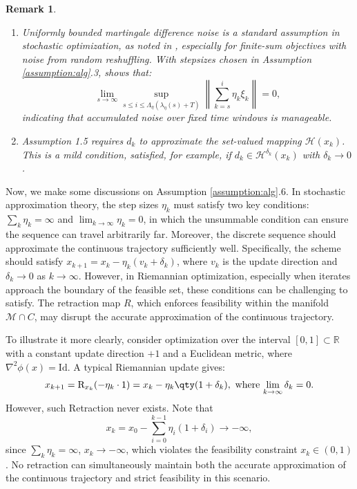 \documentclass[11pt]{article}
\def\norm#1{\left\|#1\right\|}
\newtheorem{remark}{Remark}[section]
\begin{document}
\begin{remark}
\begin{enumerate}
        
        \item 
        Uniformly bounded martingale difference noise is a standard assumption in stochastic optimization, as noted in \cite{castera2021inertial,xiao2023adam}, especially for finite-sum objectives with noise from random reshuffling. With stepsizes chosen in Assumption \ref{assumption:alg}.3, \cite{benaim2005stochastic} shows that:
        \begin{equation}
            \lim_{s\rightarrow\infty}\sup_{s\leq i\leq\Lambda_\eta(\lambda_\eta(s)+T)}\norm{\sum_{k=s}^i\eta_k\xi_k}=0,
            \label{Eq:noise_cond}
        \end{equation}   
        indicating that accumulated noise over fixed time windows is manageable.
        \item Assumption 1.5 requires $d_k$ to approximate the set-valued mapping $\mathcal{H}(x_k)$. This is a mild condition, satisfied, for example, if $d_k \in \mathcal{H}^{\delta_k}(x_k)$ with $\delta_k \to 0$.
    \end{enumerate}
\end{remark}


Now, we make some discussions on Assumption \ref{assumption:alg}.6. In stochastic approximation theory, the step sizes $\eta_k$ must satisfy two key conditions: $\sum_{k}\eta_k=\infty$ and $\lim_{k\to\infty}\eta_k=0$, in which the unsummable condition can ensure the sequence can travel arbitrarily far. Moreover, the discrete sequence should approximate the continuous trajectory sufficiently well. Specifically, the scheme should satisfy $x_{k+1}=x_k-\eta_k(v_k+\delta_k)$, where $v_k$ is the update direction and $\delta_k \to 0$ as $k \to \infty$. However, in Riemannian optimization, especially when iterates approach the boundary of the feasible set, these conditions can be challenging to satisfy. The retraction map $R$, which enforces feasibility within the manifold $\mathcal{M} \cap C$, may disrupt the accurate approximation of the continuous trajectory.

To illustrate it more clearly, consider optimization over the interval $[0,1] \subset \mathbb{R}$ with a constant update direction $+1$ and a Euclidean metric, where $\nabla^2 \phi(x) = \text{Id}$. A typical Riemannian update gives:
\[
x_{k+1}={\rm R}_{x_k}(-\eta_k\cdot1)=x_k-\eta_k\qty(1+\delta_k),\text{ where $\lim_{k\to\infty}\delta_k=0$.}
\]
However, such Retraction never exists. Note that 
\[
x_{k}=x_0-\sum_{i=0}^{k-1}\eta_i(1+\delta_i)\to-\infty,
\]
since $\sum_{k} \eta_k = \infty$, $x_k \to -\infty$, which violates the feasibility constraint $x_k \in (0,1)$. No retraction can simultaneously maintain both the accurate approximation of the continuous trajectory and strict feasibility in this scenario. 
 
\end{document}

